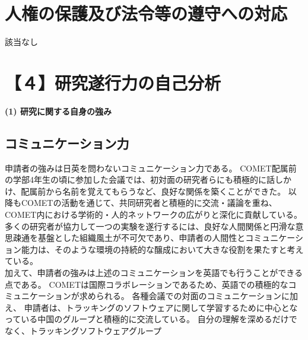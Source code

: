 \documentclass[11pt,a4j,dvipdfmx]{jarticle} 					%
\newcommand{\研究課題名}{ミューオン電子転換探索の感度向上に向けた解析手法の開発}
\newcommand{\研究機関名}{大阪大学}
\newcommand{\研究代表者氏名}{高見 翔太   }
\newcommand{\mysubsection}[1]{\vspace{-20pt}\subsection*{\colorbox{cyan!15}{\normalsize{#1}}}\vspace{-0.2cm}}
\begin{document}



\section{人権の保護及び法令等の遵守への対応}

該当なし
%




\section{【４】研究遂行力の自己分析}

\noindent
\textbf{(1) 研究に関する自身の強み}\\
\vspace{-0.5cm}
\mysubsection{コミュニケーション力}
申請者の強みは日英を問わないコミュニケーション力である。
COMET配属前の学部4年生の頃に参加した会議では、初対面の研究者らにも積極的に話しかけ、配属前から名前を覚えてもらうなど、良好な関係を築くことができた。
以降もCOMETの活動を通じて、共同研究者と積極的に交流・議論を重ね、COMET内における学術的・人的ネットワークの広がりと深化に貢献している。
多くの研究者が協力して一つの実験を遂行するには、良好な人間関係と円滑な意思疎通を基盤とした組織風土が不可欠であり、申請者の人間性とコミュニケーション能力は、そのような環境の持続的な醸成において大きな役割を果たすと考えている。\\
加えて、申請者の強みは上述のコミュニケーションを英語でも行うことができる点である。
COMETは国際コラボレーションであるため、英語での積極的なコミュニケーションが求められる。
各種会議での対面のコミュニケーションに加え、
申請者は、トラッキングのソフトウェアに関して学習するために中心となっている中国のグループと積極的に交流している。
自分の理解を深めるだけでなく、トラッキングソフトウェアグループ
	
\end{document}
